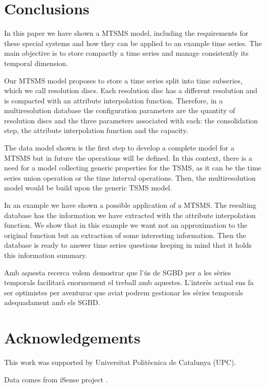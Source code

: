 \section{Conclusions} 

In this paper we have shown a MTSMS model, including the requirements
for these special systems and how they can be applied to an example
time series. The main objective is to store compactly a time series
and manage consistently its temporal dimension.

Our MTSMS model proposes to store a time series split into time
subseries, which we call resolution discs.  Each resolution disc has a
different resolution and is compacted with an attribute interpolation
function. Therefore, in a multiresolution database the configuration
parameters are the quantity of resolution discs and the three
parameters associated with each: the consolidation step, the attribute
interpolation function and the capacity.

The data model shown is the first step to develop a complete model for
a MTSMS but in future the operations will be defined. In this context,
there is a need for a model collecting generic properties for the
TSMS, as it can be the time series union operation or the time
interval operations. Then, the multiresolution model would be build
upon the generic TSMS model.

In an example we have shown a possible application of a MTSMS. The
resulting database has the information we have extracted with the
attribute interpolation function. We show that in this example we want
not an approximation to the original function but an extraction of
some interesting information. Then the database is ready to answer
time series questions keeping in mind that it holds this information
summary.



Amb aquesta recerca volem demostrar que l'ús de SGBD per a les sèries temporals facilitarà enormement el treball amb aquestes.
L'interès actual ens fa ser optimistes per aventurar que aviat podrem gestionar les sèries temporals adequadament amb els SGBD.



\section*{Acknowledgements}

This work was supported by Universitat Polit\`{e}cnica de Catalunya (UPC).

Data comes from iSense project .








